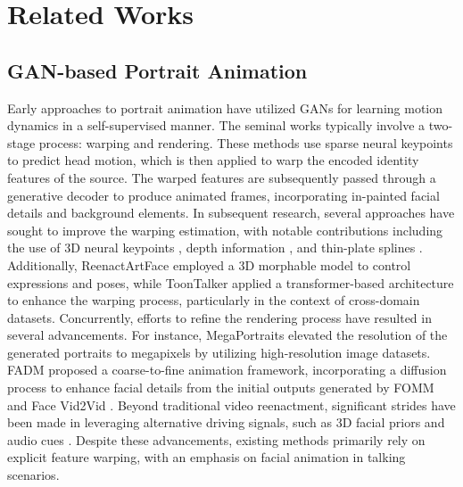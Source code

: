 \section{Related Works}
\subsection{GAN-based Portrait Animation}

Early approaches to portrait animation have utilized GANs for learning motion dynamics in a self-supervised manner. The seminal works \cite{Siarohin_2019_CVPR,Siarohin_2019_NeurIPS} typically involve a two-stage process: warping and rendering. These methods use sparse neural keypoints to predict head motion, which is then applied to warp the encoded identity features of the source. The warped features are subsequently passed through a generative decoder to produce animated frames, incorporating in-painted facial details and background elements. In subsequent research, several approaches have sought to improve the warping estimation, with notable contributions including the use of 3D neural keypoints \cite{wang2021facevid2vid}, depth information \cite{hong2022depth}, and thin-plate splines \cite{siarohin2021motion}. Additionally, ReenactArtFace \cite{10061279} employed a 3D morphable model to control expressions and poses, while ToonTalker \cite{gong2023toontalker} applied a transformer-based architecture to enhance the warping process, particularly in the context of cross-domain datasets. Concurrently, efforts to refine the rendering process have resulted in several advancements. For instance, MegaPortraits \cite{megaportraits} elevated the resolution of the generated portraits to megapixels by utilizing high-resolution image datasets. FADM \cite{1020894} proposed a coarse-to-fine animation framework, incorporating a diffusion process to enhance facial details from the initial outputs generated by FOMM \cite{Siarohin_2019_NeurIPS} and Face Vid2Vid \cite{wang2021facevid2vid}. Beyond traditional video reenactment, significant strides have been made in leveraging alternative driving signals, such as 3D facial priors \cite{deng2020disentangled,Khakhulin2022ROME,sun2023next3d,DECA:Siggraph2021,10203414} and audio cues \cite{guo2021adnerf,10.1145/3550469.3555393,fei2024flux}. Despite these advancements, existing methods primarily rely on explicit feature warping, with an emphasis on facial animation in talking scenarios. 




